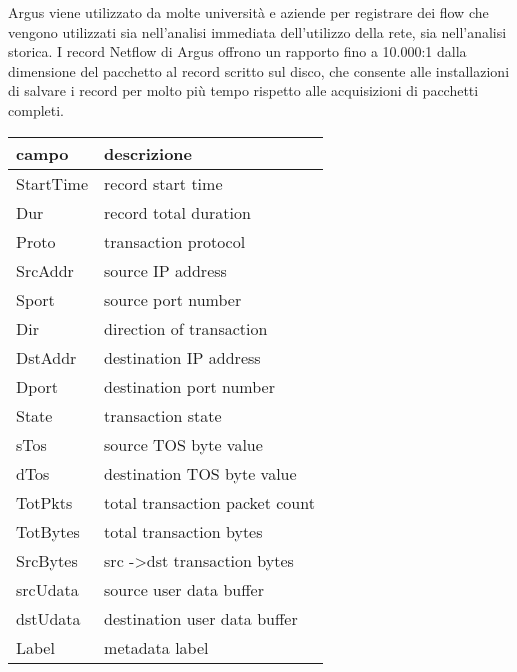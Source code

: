 \documentclass[../main.tex]{subfiles}
\begin{document}
Argus viene utilizzato da molte università e aziende per registrare dei flow che vengono utilizzati sia nell'analisi immediata dell'utilizzo della rete, sia nell'analisi storica.
I record Netflow di Argus offrono un rapporto fino a 10.000:1 dalla dimensione del pacchetto al record scritto sul disco, che consente alle installazioni di salvare i record per molto più tempo rispetto alle acquisizioni di pacchetti completi.


\begin{table}[h]
\begin{tabular}{|l|l|}
\hline
\textbf{campo} & \textbf{descrizione}                    \\ \hline
StartTime      & record start time                       \\ \hline
Dur            & record total duration                   \\ \hline
Proto          & transaction protocol                    \\ \hline
SrcAddr        & source IP address                       \\ \hline
Sport          & source port number                      \\ \hline
Dir            & direction of transaction                \\ \hline
DstAddr        & destination IP address                  \\ \hline
Dport          & destination port number                 \\ \hline
State          & transaction state                       \\ \hline
sTos           & source TOS byte value                   \\ \hline
dTos           & destination TOS byte value              \\ \hline
TotPkts        & total transaction packet count          \\ \hline
TotBytes       & total transaction bytes                 \\ \hline
SrcBytes       & src -\textgreater dst transaction bytes \\ \hline
srcUdata       & source user data buffer                 \\ \hline
dstUdata       & destination user data buffer            \\ \hline
Label          & metadata label                          \\ \hline
\end{tabular}
\end{table}
\end{document}
